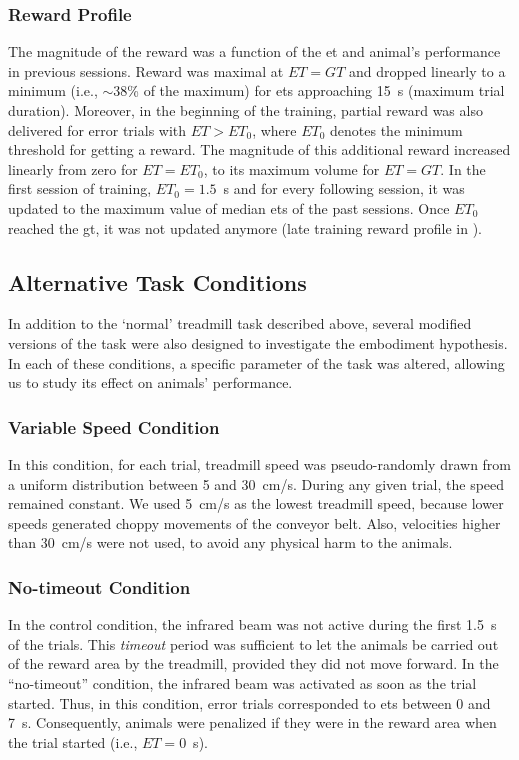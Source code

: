 \subsubsection{Reward Profile} \label{ch:methods:reward}
The magnitude of the reward was a function of the \gls{et} and animal's performance in previous sessions.
Reward was maximal at $ET=GT$ and dropped linearly to a minimum (i.e., $\sim$38\% of the maximum) for \glspl{et} approaching 15~s (maximum trial duration).
Moreover, in the beginning of the training, partial reward was also delivered for error trials with $ET>ET_0$, where $ET_0$ denotes the minimum threshold for getting a reward.
The magnitude of this additional reward increased linearly from zero for $ET=ET_0$, to its maximum volume for $ET=GT$.
In the first session of training, $ET_0=1.5$~s and for every following session, it was updated to the maximum value of median \glspl{et} of the past sessions.
Once $ET_0$ reached the \gls{gt}, it was not updated anymore (late training reward profile in ).

\subsection{Alternative Task Conditions}
In addition to the `normal' treadmill task described above, several modified versions of the task were also designed to investigate the embodiment hypothesis.
In each of these conditions, a specific parameter of the task was altered, allowing us to study its effect on animals' performance.

\subsubsection{Variable Speed Condition}
In this condition, for each trial, treadmill speed was pseudo-randomly drawn from a uniform distribution between 5 and 30~cm/s.
During any given trial, the speed remained constant.
We used 5~cm/s as the lowest treadmill speed, because lower speeds generated choppy movements of the conveyor belt.
Also, velocities higher than 30~cm/s were not used, to avoid any physical harm to the animals.

\subsubsection{No-timeout Condition}
In the control condition, the infrared beam was not active during the first 1.5~s of the trials.
This \emph{timeout}\!{} period was sufficient to let the animals be carried out of the reward area by the treadmill, provided they did not move forward.
In the ``no-timeout'' condition, the infrared beam was activated as soon as the trial started.
Thus, in this condition, error trials corresponded to \glspl{et} between 0 and 7~s.
Consequently, animals were penalized if they were in the reward area when the trial started (i.e., $ET=0$~s).

